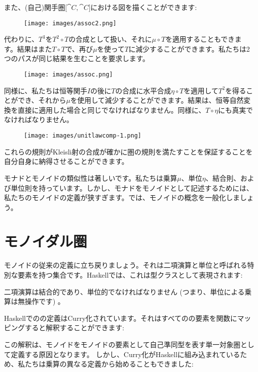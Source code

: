 \noindent
また、(自己)関手圏${[}\cat{C}, \cat{C}{]}$における図を描くことができます: 

\begin{figure}[H]
  \centering
  \texttt{[image: images/assoc2.png]}
\end{figure}

\noindent
代わりに、$T^3$を$T^2 \circ T$の合成として扱い、それに$\mu \circ T$を適用することもできます。結果はまた$T \circ T$で、再び$\mu$を使って$T$に減少することができます。私たちは2つのパスが同じ結果を生むことを要求します。

\begin{figure}[H]
  \centering
  \texttt{[image: images/assoc.png]}
\end{figure}

\noindent
同様に、私たちは恒等関手$I$の後に$T$の合成に水平合成$\eta \circ T$を適用して$T^2$を得ることができ、それから$\mu$を使用して減少することができます。結果は、恒等自然変換を直接に適用した場合と同じでなければなりません。同様に、$T \circ \eta$にも真実でなければなりません。

\begin{figure}[H]
  \centering
  \texttt{[image: images/unitlawcomp-1.png]}
\end{figure}

\noindent
これらの規則がKleisli射の合成が確かに圏の規則を満たすことを保証することを自分自身に納得させることができます。

モナドとモノイドの類似性は著しいです。私たちは乗算$\mu$、単位$\eta$、結合則、および単位則を持っています。しかし、モナドをモノイドとして記述するためには、私たちのモノイドの定義が狭すぎます。では、モノイドの概念を一般化しましょう。

\section{モノイダル圏}

モノイドの従来の定義に立ち戻りましょう。それは二項演算と単位と呼ばれる特別な要素を持つ集合です。Haskellでは、これは型クラスとして表現されます: 

二項演算は結合的であり、単位的でなければなりません (つまり、単位による乗算は無操作です) 。

Haskellでのの定義はCurry化されています。それはすべてのの要素を関数にマッピングすると解釈することができます: 

この解釈は、モノイドをモノイドの要素として自己準同型を表す単一対象圏として定義する原因となります。
しかし、Curry化がHaskellに組み込まれているため、私たちは乗算の異なる定義から始めることもできました: 


